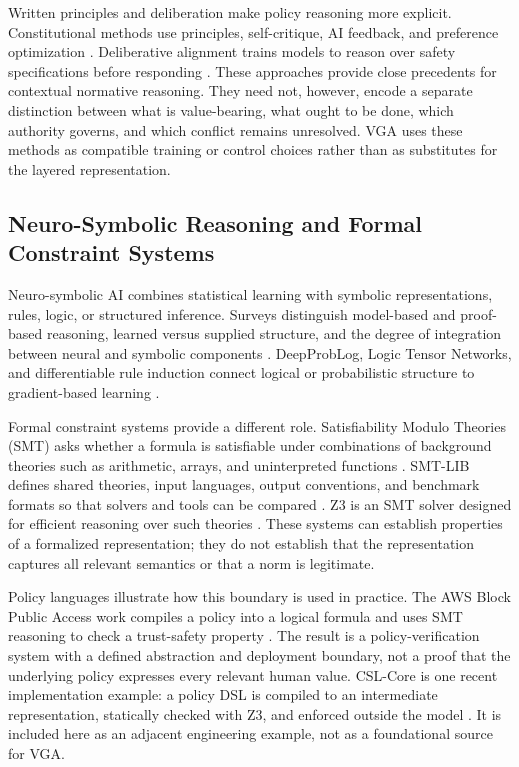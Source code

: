 Written principles and deliberation make policy reasoning more explicit. Constitutional methods use principles, self-critique, AI feedback, and preference optimization \citep{bai2022constitutional,lee2023rlaif}. Deliberative alignment trains models to reason over safety specifications before responding \citep{guan2024deliberative}. These approaches provide close precedents for contextual normative reasoning. They need not, however, encode a separate distinction between what is value-bearing, what ought to be done, which authority governs, and which conflict remains unresolved. VGA uses these methods as compatible training or control choices rather than as substitutes for the layered representation.

\subsection{Neuro-Symbolic Reasoning and Formal Constraint Systems}

Neuro-symbolic AI combines statistical learning with symbolic representations, rules, logic, or structured inference. Surveys distinguish model-based and proof-based reasoning, learned versus supplied structure, and the degree of integration between neural and symbolic components \citep{deraedt2020neurosymbolic,marra2024survey,garcez2019neurosymbolic}. DeepProbLog, Logic Tensor Networks, and differentiable rule induction connect logical or probabilistic structure to gradient-based learning \citep{manhaeve2018deepproblog,badreddine2022logic,evans2018dilp}.

Formal constraint systems provide a different role. Satisfiability Modulo Theories (SMT) asks whether a formula is satisfiable under combinations of background theories such as arithmetic, arrays, and uninterpreted functions \citep{barrett2021satisfiability}. SMT-LIB defines shared theories, input languages, output conventions, and benchmark formats so that solvers and tools can be compared \citep{barrett2010smtlib,barrett2025smtlib}. Z3 is an SMT solver designed for efficient reasoning over such theories \citep{demoura2008z3}. These systems can establish properties of a formalized representation; they do not establish that the representation captures all relevant semantics or that a norm is legitimate.

Policy languages illustrate how this boundary is used in practice. The AWS Block Public Access work compiles a policy into a logical formula and uses SMT reasoning to check a trust-safety property \citep{bouchet2020blockpublicaccess}. The result is a policy-verification system with a defined abstraction and deployment boundary, not a proof that the underlying policy expresses every relevant human value. CSL-Core is one recent implementation example: a policy DSL is compiled to an intermediate representation, statically checked with Z3, and enforced outside the model \citep{chimera2026cslcore}. It is included here as an adjacent engineering example, not as a foundational source for VGA.


